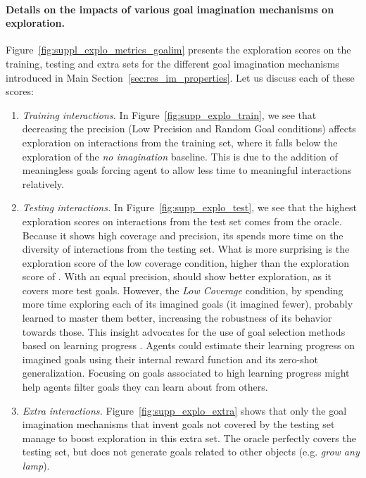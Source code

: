 \clearpage
\paragraph{Details on the impacts of various goal imagination mechanisms on exploration.}
Figure~\ref{fig:suppl_explo_metrics_goalim} presents the \itwoc exploration scores on the training, testing and extra sets for the different goal imagination mechanisms introduced in Main Section~\ref{sec:res_im_properties}. Let us discuss each of these scores:

\begin{enumerate}
    \item \textit{Training interactions.} In Figure~\ref{fig:supp_explo_train}, we see that decreasing the precision (Low Precision and Random Goal conditions) affects exploration on interactions from the training set, where it falls below the exploration of the \textit{no imagination} baseline. This is due to the addition of meaningless goals forcing agent to allow less time to meaningful interactions relatively.
    \item \textit{Testing interactions.}
    In Figure~\ref{fig:supp_explo_test}, we see that the highest exploration scores on interactions from the test set comes from the oracle. Because it shows high coverage and precision, its spends more time on the diversity of interactions from the testing set. What is more surprising is the exploration score of the low coverage condition, higher than the exploration score of \CGH. With an equal precision, \CGH should show better exploration, as it covers more test goals. However, the \textit{Low Coverage} condition, by spending more time exploring each of its imagined goals (it imagined fewer), probably learned to master them better, increasing the robustness of its behavior towards those. This insight advocates for the use of goal selection methods based on learning progress \cite{forestier2016modular,curious}. Agents could estimate their learning progress on imagined goals using their internal reward function and its zero-shot generalization. Focusing on goals associated to high learning progress might help agents filter goals they can learn about from others.
    
    \item \textit{Extra interactions.} Figure~\ref{fig:supp_explo_extra} shows that only the goal imagination mechanisms that invent goals not covered by the testing set manage to boost exploration in this extra set. The oracle perfectly covers the testing set, but does not generate goals related to other objects (e.g. \textit{grow any lamp}). 
\end{enumerate} 


